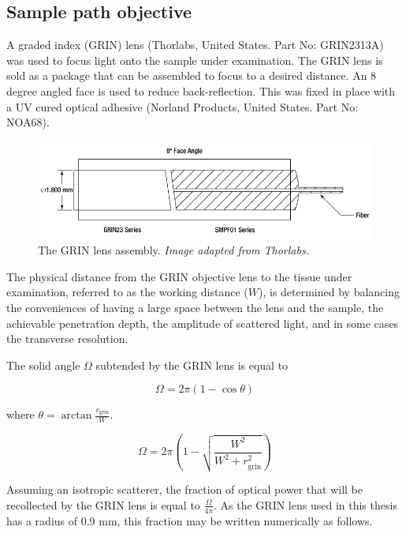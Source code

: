 \subsection{Sample path objective}

A graded index (GRIN) lens (Thorlabs, United States. Part No: GRIN2313A) was used to focus light onto the sample under examination. The GRIN lens is sold as a package that can be assembled to focus to a desired distance. An 8 degree angled face is used to reduce back-reflection. This was fixed in place with a UV cured optical adhesive (Norland Products, United States. Part No: NOA68).

\begin{figure}[h!]
\centering
\includegraphics[width=1.0\textwidth]{Images/System/grin_angled.png}
\caption[The GRIN lens assembly.]{The GRIN lens assembly. \em{Image adapted from Thorlabs.} \label{fig:grin_assembly}}
\end{figure}

The physical distance from the GRIN objective lens to the tissue under examination, referred to as the working distance ($W$), is determined by balancing the conveniences of having a large space between the lens and the sample, the achievable penetration depth, the amplitude of scattered light, and in some cases the transverse resolution.


The solid angle $\Omega$ subtended by the GRIN lens is equal to

\begin{equation}
\Omega = 2 \pi (1 - \cos{\theta})
\end{equation}

where $\theta = \arctan{\frac{r_{\mathrm{grin}}}{W}}$.

\begin{equation}
\Omega = 2 \pi \left(1 - \sqrt{\frac{W^2}{W^2 + r_{\mathrm{grin}}^2}} \right)
\end{equation}

Assuming an isotropic scatterer, the fraction of optical power that will be recollected by the GRIN lens is equal to $\frac{\Omega}{4 \pi}$. As the GRIN lens used in this thesis has a radius of 0.9 mm, this fraction may be written numerically as follows.

